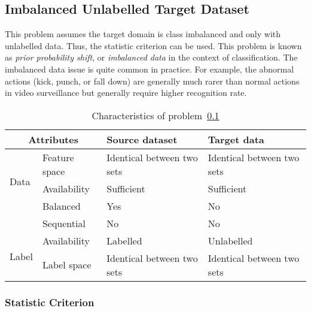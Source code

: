 \documentclass[prodmode]{acmsmall}  %
\begin{document}
\subsection{Imbalanced Unlabelled Target Dataset}
\label{sec:HOMOimb}
This problem assumes the target domain is class imbalanced and only with unlabelled data. Thus, the statistic criterion can be used. This problem is known as \textit{prior probability shift}, or \textit{imbalanced data} in the context of classification. The imbalanced data issue is quite common in practice. For example, the abnormal actions (kick, punch, or fall down) are generally much rarer than normal actions in video surveillance but generally require higher recognition rate.
\begin{table}[htbp!]
\caption{Characteristics of problem~\ref{sec:HOMOimb}}
\label{tab:HOMOimb}
\begin{center}
\begin{small}
\begin{tabular}{|p{1cm}<{\centering}|m{2.5cm}<{\centering}|m{4.3cm}<{\centering}|m{4.3cm}<{\centering}|}
\hline
\multicolumn{2}{|c|}{Attributes} & Source dataset & Target data \\
\hline \hline
\multirow{3}{*}{Data} & Feature space & Identical between two sets & Identical between two sets \\ 
\cline{2-4}{} & Availability & Sufficient & Sufficient  \\
\cline{2-4}{} & Balanced & Yes & {\color{red}No} \\
\cline{2-4}{} & Sequential & No & No \\
\hline \hline
\multirow{2}{*}{Label} & Availability & Labelled & {\color{red}Unlabelled} \\
\cline{2-4}{}  & Label space & Identical between two sets & Identical between two sets \\ 
\hline
\end{tabular}
\end{small}
\end{center}
\end{table}

\subsubsection{Statistic Criterion}
\end{document}
